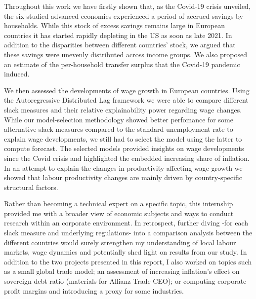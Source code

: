\quad Throughout this work we have firstly shown that, as the Covid-19 crisis unveiled, the six studied advanced economies experienced a period of accrued savings by households. 
While this stock of excess savings remains large in European countries it has started rapidly depleting in the US as soon as late 2021. 
In addition to the disparities between different countries' stock, we argued that these savings were unevenly distributed across income groups.
We also proposed an estimate of the per-household transfer surplus that the Covid-19 pandemic induced.

We then assessed the developments of wage growth in European countries. 
Using the Autoregressive Distributed Lag framework we were able to compare different slack measures and their relative explainability power regarding wage changes.
While our model-selection methodology showed better perfomance for some alternative slack measures compared to the standard unemployment rate to explain wage developments, we still had to select the model using the latter to compute forecast. 
The selected models provided insights on wage developments since the Covid crisis and highlighted the embedded increasing share of inflation. In an attempt to explain the changes in productivity affecting wage growth we showed that labour productivity changes are mainly driven by country-specific structural factors.

Rather than becoming a technical expert on a specific topic, this internship provided me with a broader view of economic subjects and ways to conduct research within an corporate environment. 
In retrospect, further diving -for each slack measure and underlying regulations- into a comparison analysis between the different countries would surely strengthen my understanding of local labour markets, wage dynamics and potentially shed light on results from our study.
In addition to the two projects presented in this report, I also worked on topics such as a small global trade model\cite{az_trade}; an assessment of increasing inflation’s effect on sovereign debt ratio (materials for Allianz Trade CEO\cite{az_debt}); or computing corporate profit margins and introducing a proxy for some industries\cite{az_margins}.